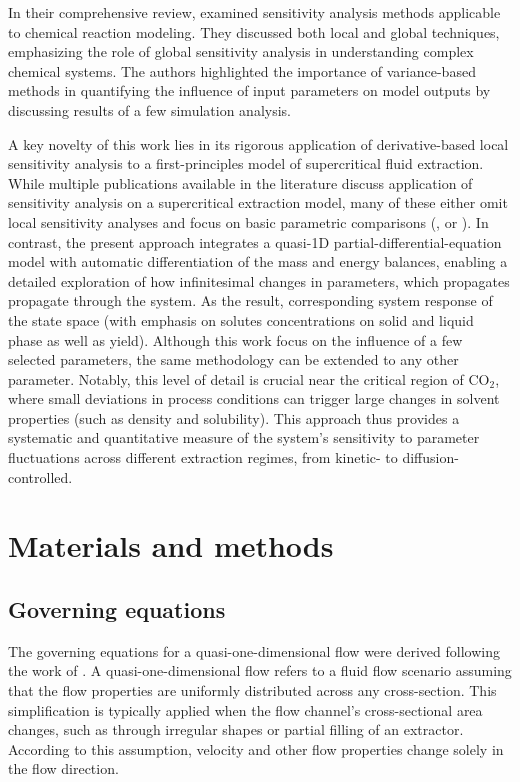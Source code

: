 \documentclass[a4paper,fleqn]{cas-dc}
\begin{document}
	In their comprehensive review, \citet{Saltelli2005} examined sensitivity analysis methods applicable to chemical reaction modeling. They discussed both local and global techniques, emphasizing the role of global sensitivity analysis in understanding complex chemical systems. The authors highlighted the importance of variance-based methods in quantifying the influence of input parameters on model outputs by discussing results of a few simulation analysis.
	
	{\color{blue}A key novelty of this work lies in its rigorous application of derivative-based local sensitivity analysis to a first-principles model of supercritical fluid extraction. While multiple publications available in the literature discuss application of sensitivity analysis on a supercritical extraction model, many of these either omit local sensitivity analyses and focus on basic parametric comparisons (\citet{Santos2000}, \citet{Fiori_2007} or \citet{Zahedi2010}). In contrast, the present approach integrates a quasi-1D partial-differential-equation model with automatic differentiation of the mass and energy balances, enabling a detailed exploration of how infinitesimal changes in parameters, which propagates propagate through the system. As the result, corresponding system response of the state space (with emphasis on solutes concentrations on solid and liquid phase as well as yield). Although this work focus on the influence of a few selected parameters, the same methodology can be extended to any other parameter. Notably, this level of detail is crucial near the critical region of CO$_2$, where small deviations in process conditions can trigger large changes in solvent properties (such as density and solubility). This approach thus provides a systematic and quantitative measure of the system’s sensitivity to parameter fluctuations across different extraction regimes, from kinetic- to diffusion-controlled.}
	
	
	\section{Materials and methods} \label{CH: Materials and methods}
	
	\subsection{Governing equations} \label{CH:Governing_equations_chapter}
	The governing equations for a quasi-one-dimensional flow were derived following the work of \citet{Anderson1995}. A quasi-one-dimensional flow refers to a fluid flow scenario assuming that the flow properties are uniformly distributed across any cross-section. This simplification is typically applied when the flow channel's cross-sectional area changes, such as through irregular shapes or partial filling of an extractor. According to this assumption, velocity and other flow properties change solely in the flow direction.
	
\end{document}
